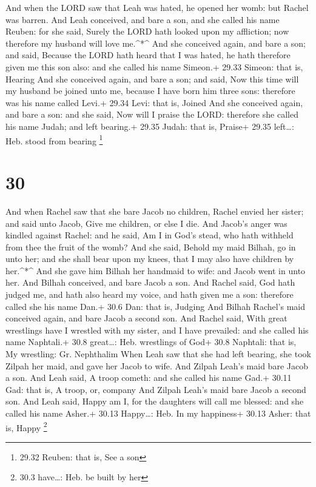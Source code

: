  And when the LORD saw that Leah was hated, he opened her
womb: but Rachel was barren.  And Leah conceived, and bare
a son, and she called his name Reuben: for she said, Surely the LORD
hath looked upon my affliction; now therefore my husband will love
me.\^{}*\^{}  And she conceived again, and bare a son; and
said, Because the LORD hath heard that I was hated, he hath therefore
given me this son also: and she called his name Simeon.+ 29.33 Simeon:
that is, Hearing  And she conceived again, and bare a son;
and said, Now this time will my husband be joined unto me, because I
have born him three sons: therefore was his name called Levi.+ 29.34
Levi: that is, Joined  And she conceived again, and bare a
son: and she said, Now will I praise the LORD: therefore she called his
name Judah; and left bearing.+ 29.35 Judah: that is, Praise+ 29.35
left\ldots: Heb. stood from bearing \footnote{29.32 Reuben: that is, See
  a son}

\hypertarget{section-29}{%
\section{30}\label{section-29}}

 And when Rachel saw that she bare Jacob no children, Rachel
envied her sister; and said unto Jacob, Give me children, or else I die.
 And Jacob's anger was kindled against Rachel: and he said,
Am I in God's stead, who hath withheld from thee the fruit of the womb?
 And she said, Behold my maid Bilhah, go in unto her; and
she shall bear upon my knees, that I may also have children by
her.\^{}*\^{}  And she gave him Bilhah her handmaid to wife:
and Jacob went in unto her.  And Bilhah conceived, and bare
Jacob a son.  And Rachel said, God hath judged me, and hath
also heard my voice, and hath given me a son: therefore called she his
name Dan.+ 30.6 Dan: that is, Judging  And Bilhah Rachel's
maid conceived again, and bare Jacob a second son.  And
Rachel said, With great wrestlings have I wrestled with my sister, and I
have prevailed: and she called his name Naphtali.+ 30.8 great\ldots:
Heb. wrestlings of God+ 30.8 Naphtali: that is, My wrestling: Gr.
Nephthalim  When Leah saw that she had left bearing, she
took Zilpah her maid, and gave her Jacob to wife.  And
Zilpah Leah's maid bare Jacob a son.  And Leah said, A
troop cometh: and she called his name Gad.+ 30.11 Gad: that is, A troop,
or, company  And Zilpah Leah's maid bare Jacob a second
son.  And Leah said, Happy am I, for the daughters will
call me blessed: and she called his name Asher.+ 30.13 Happy\ldots: Heb.
In my happiness+ 30.13 Asher: that is, Happy \footnote{30.3 have\ldots:
  Heb. be built by her}

